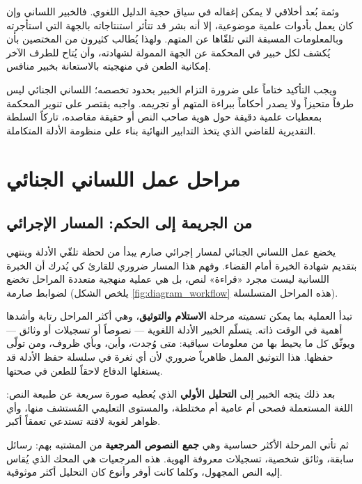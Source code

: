 وثمة بُعد أخلاقي لا يمكن إغفاله في سياق حجية الدليل اللغوي. فالخبير اللساني وإن كان يعمل بأدوات علمية موضوعية، إلا أنه بشر قد تتأثر استنتاجاته بالجهة التي استأجرته وبالمعلومات المسبقة التي تلقّاها عن المتهم. ولهذا يُطالب كثيرون من المختصين بأن يُكشف لكل خبير في المحكمة عن الجهة الممولة لشهادته، وأن يُتاح للطرف الآخر إمكانية الطعن في منهجيته بالاستعانة بخبير منافس.

ويجب التأكيد ختاماً على ضرورة التزام الخبير بحدود تخصصه؛ اللساني الجنائي ليس طرفاً متحيزاً ولا يصدر أحكاماً ببراءة المتهم أو تجريمه. واجبه يقتصر على تنوير المحكمة بمعطيات علمية دقيقة حول هوية صاحب النص أو حقيقة مقاصده، تاركاً السلطة التقديرية للقاضي الذي يتخذ التدابير النهائية بناء على منظومة الأدلة المتكاملة.



\section{مراحل عمل اللساني الجنائي}

\subsection{من الجريمة إلى الحكم: المسار الإجرائي}

يخضع عمل اللساني الجنائي لمسار إجرائي صارم يبدأ من لحظة تلقّي الأدلة وينتهي بتقديم شهادة الخبرة أمام القضاء. وفهم هذا المسار ضروري للقارئ كي يُدرك أن الخبرة اللسانية ليست مجرد «قراءة» لنص، بل هي عملية منهجية متعددة المراحل تخضع لضوابط صارمة (يلخص الشكل \ref{fig:diagram_workflow} هذه المراحل المتسلسلة).

\diagramWorkflow

تبدأ العملية بما يمكن تسميته مرحلة \textbf{الاستلام والتوثيق}، وهي أكثر المراحل رتابة وأشدها أهمية في الوقت ذاته. يتسلّم الخبير الأدلة اللغوية — نصوصاً أو تسجيلات أو وثائق — ويوثّق كل ما يحيط بها من معلومات سياقية: متى وُجدت، وأين، وبأي ظروف، ومن تولّى حفظها. هذا التوثيق الممل ظاهرياً ضروري لأن أي ثغرة في سلسلة حفظ الأدلة قد يستغلها الدفاع لاحقاً للطعن في صحتها.

بعد ذلك يتجه الخبير إلى \textbf{التحليل الأولي} الذي يُعطيه صورة سريعة عن طبيعة النص: اللغة المستعملة فصحى أم عامية أم مختلطة، والمستوى التعليمي المُستشف منها، وأي ظواهر لغوية لافتة تستدعي تعمقاً أكبر.

ثم تأتي المرحلة الأكثر حساسية وهي \textbf{جمع النصوص المرجعية} من المشتبه بهم: رسائل سابقة، وثائق شخصية، تسجيلات معروفة الهوية. هذه المرجعيات هي المحك الذي يُقاس إليه النص المجهول، وكلما كانت أوفر وأنوع كان التحليل أكثر موثوقية.

